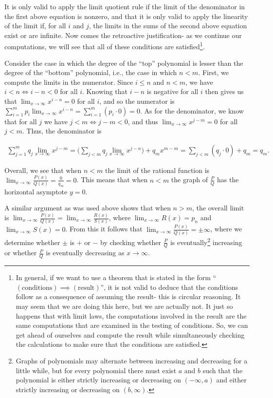 It is only valid to apply the limit quotient rule if the limit of the denominator in the first above equation is nonzero, and that it is only valid to apply the linearity of the limit if, for all $i$ and $j$, the limits in the sums of the second above equation exist or are infinite. Now comes the retroactive justification- as we continue our computations, we will see that all of these conditions are satisfied\footnote{In general, if we want to use a theorem that is stated in the form ``$(\text{conditions}) \implies (\text{result})$'', it is not valid to deduce that the conditions follow as a consequence of assuming the result- this is circular reasoning. It may seem that we are doing this here, but we are actually not. It just so happens that with limit laws, the computations involved in the result are the same computations that are examined in the testing of conditions. So, we can get ahead of ourselves and compute the result while simultaneously checking the calculations to make sure that the conditions are satisfied.}.

Consider the case in which the degree of the ``top'' polynomial is lesser than the degree of the ``bottom'' polynomial, i.e., the case in which $n < m$. First, we compute the limits in the numerator. Since $i \leq n$ and $n < m$, we have $i < n \iff i - n < 0$ for all $i$. Knowing that $i - n$ is negative for all $i$ then gives us that $\lim_{x \rightarrow \infty} x^{i - n} = 0$ for all $i$, and so the numerator is $\sum_{i = 1}^m p_i \lim_{x \rightarrow \infty} x^{i - n} = \sum_{i = 1}^m (p_i \cdot 0) = 0$. As for the denominator, we know that for all $j$ we have $j < m \iff j - m < 0$, and thus $\lim_{x \rightarrow \infty} x^{j - m} = 0$ for all $j < m$. Thus, the denominator is 

\begin{align*}
    \sum_{j = 1}^m q_j \lim_{x \rightarrow \infty} x^{j - m} = \Big( \sum_{j < m} q_j \lim_{x \rightarrow \infty} x^{j - n} \Big) + q_m x^{m - m} = \sum_{j < m} (q_j \cdot 0) + q_m = q_m.
\end{align*}

Overall, we see that when $n < m$ the limit of the rational function is $\lim_{x \rightarrow \infty} \frac{P(x)}{Q(x)} = \frac{0}{q_m} = 0$. This means that when $n < m$ the graph of $\frac{P}{Q}$ has the horizontal asymptote $y = 0$. 

A similar argument as was used above shows that when $n > m$, the overall limit is $\lim_{x \rightarrow \infty} \frac{P(x)}{Q(x)} = \lim_{x \rightarrow \infty} \frac{R(x)}{S(x)}$, where $\lim_{x \rightarrow \infty} R(x) = p_n$ and $\lim_{x \rightarrow \infty} S(x) = 0$. From this it follows that $\lim_{x \rightarrow \infty} \frac{P(x)}{Q(x)} = \pm \infty$, where we determine whether $\pm$ is $+$ or $-$ by checking whether $\frac{P}{Q}$ is eventually\footnote{Graphs of polynomials may alternate between increasing and decreasing for a little while, but for every polynomial there must exist $a$ and $b$ such that the polynomial is either strictly increasing or decreasing on $(-\infty, a)$ and either strictly increasing or decreasing on $(b, \infty)$.} increasing or whether $\frac{P}{Q}$ is eventually decreasing as $x \rightarrow \infty$.

